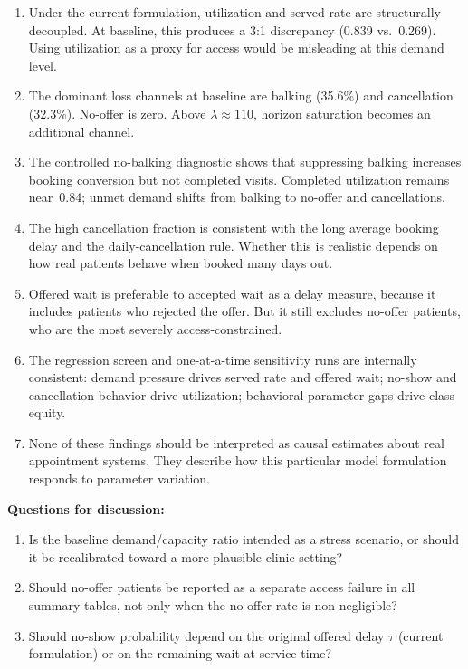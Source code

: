 \documentclass[11pt]{article}
\begin{document}
\begin{enumerate}[leftmargin=1.5em, itemsep=4pt]
\item Under the current formulation, utilization and served rate are
structurally decoupled. At baseline, this produces a 3:1 discrepancy
(0.839 vs.\ 0.269). Using utilization as a proxy for access would be
misleading at this demand level.

\item The dominant loss channels at baseline are balking (35.6\%) and
cancellation (32.3\%). No-offer is zero. Above $\lambda \approx 110$,
horizon saturation becomes an additional channel.

\item The controlled no-balking diagnostic shows that suppressing balking
increases booking conversion but not completed visits. Completed utilization
remains near~0.84; unmet demand shifts from balking to no-offer and
cancellations.

\item The high cancellation fraction is consistent with the long average
booking delay and the daily-cancellation rule. Whether this is realistic
depends on how real patients behave when booked many days out.

\item Offered wait is preferable to accepted wait as a delay measure,
because it includes patients who rejected the offer. But it still excludes
no-offer patients, who are the most severely access-constrained.

\item The regression screen and one-at-a-time sensitivity runs are
internally consistent: demand pressure drives served rate and offered
wait; no-show and cancellation behavior drive utilization; behavioral
parameter gaps drive class equity.

\item None of these findings should be interpreted as causal estimates
about real appointment systems. They describe how this particular model
formulation responds to parameter variation.
\end{enumerate}

\bigskip
\noindent\textbf{Questions for discussion:}
\begin{enumerate}[leftmargin=1.5em, itemsep=4pt]
\item Is the baseline demand/capacity ratio intended as a stress scenario,
or should it be recalibrated toward a more plausible clinic setting?
\item Should no-offer patients be reported as a separate access failure
in all summary tables, not only when the no-offer rate is non-negligible?
\item Should no-show probability depend on the original offered delay $\tau$
(current formulation) or on the remaining wait at service time?
\end{enumerate}
\end{document}
